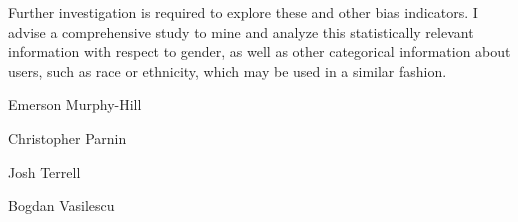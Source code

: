 \documentclass[authoryear]{sigplanconf}
\begin{document}
Further investigation is required to explore these and other bias indicators. I
advise a comprehensive study to mine and analyze this statistically relevant
information with respect to gender, as well as other categorical information
about users, such as race or ethnicity, which may be used in a similar fashion.


\acks
\begin{description}
  \item Emerson Murphy-Hill
  \item Christopher Parnin
  \item Josh Terrell
  \item Bogdan Vasilescu
\end{description}






\end{document}
